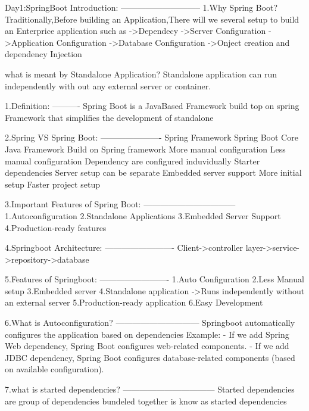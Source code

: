 Day1:SpringBoot Introduction:
-----------------------------
        1.Why Spring Boot?
            Traditionally,Before building an Application,There will we several setup to build an Enterprice application such as
               ->Dependecy
               ->Server Configuration
               ->Application Configuration
               ->Database Configuration
               ->Onject creation and dependency Injection




        what is meant by Standalone Application?
        Standalone application can run independently with out any external server or container.




    1.Definition:
     ----------
    Spring Boot is a JavaBased Framework build top on spring Framework that simplifies the development of standalone 
    
    2.Spring VS Spring Boot:
    ----------------------
        Spring Framework	                     Spring Boot
           Core Java Framework					 Build on Spring framework
            More manual configuration	         Less manual configuration
          Dependency are configured induvidually	 Starter dependencies
            Server setup can be separate	     Embedded server support
            More initial setup	                 Faster project setup




    3.Important Features of Spring Boot:
    ---------------------------------
            1.Autoconfiguration
            2.Standalone Applications
            3.Embedded Server Support
            4.Production-ready features
			
			
	4.Springboot Architecture:
	-------------------------
		Client->controller layer->service->repository->database
		
	5.Features of Springboot:
	-------------------------
		1.Auto Configuration
		2.Less Manual setup
		3.Embedded server
		4.Standalone application ->Runs independently without an external server
		5.Production-ready application
		6.Easy Development
		
		
	6.What is Autoconfiguration?
	------------------------------
	Springboot automatically configures the application based on dependencies
	Example:
		- If we add Spring Web dependency, Spring Boot configures web-related components.
		- If we add JDBC dependency, Spring Boot configures database-related components (based on available configuration).
		
	7.what is started dependencies?
	---------------------------------
	Started dependencies are group of dependencies bundeled together is know as started dependencies
	
